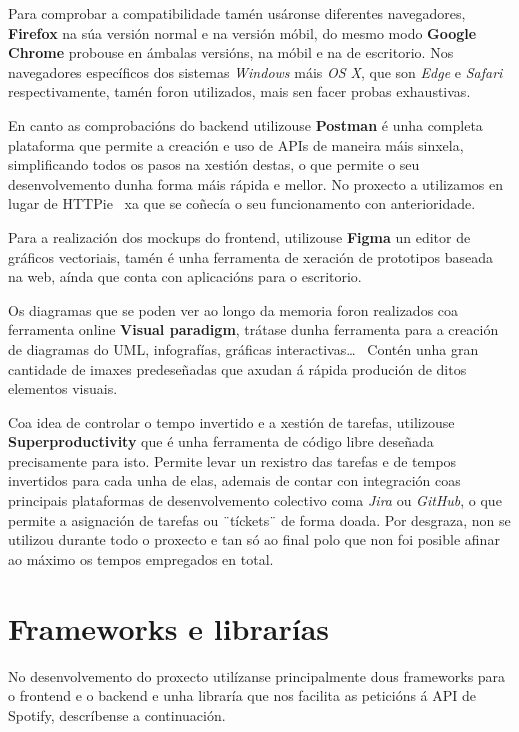 Para comprobar a compatibilidade tamén usáronse diferentes navegadores, \textbf{Firefox} na súa versión normal e na versión móbil, do mesmo modo \textbf{Google Chrome} probouse en ámbalas versións, na móbil e na de escritorio. Nos navegadores específicos dos sistemas \textit{Windows} máis \textit{OS X}, que son \textit{Edge} e \textit{Safari} respectivamente, tamén foron utilizados, mais sen facer probas exhaustivas.\medbreak

En canto as comprobacións do backend utilizouse \textbf{Postman}\label{sec:postman} é unha completa plataforma que permite a creación e uso de \glspl{API} de maneira máis sinxela, simplificando todos os pasos na xestión destas, o que permite o seu desenvolvemento dunha forma máis rápida e mellor. No proxecto a utilizamos en lugar de HTTPie~\cite{httpie} xa que se coñecía o seu funcionamento con anterioridade.\medbreak

Para a realización dos mockups do frontend, utilizouse \textbf{Figma} un editor de gráficos vectoriais, tamén é unha ferramenta de xeración de prototipos baseada na web, aínda que conta con aplicacións para o escritorio.\medbreak

Os diagramas que se poden ver ao longo da memoria foron realizados coa ferramenta online \textbf{Visual paradigm}, trátase dunha ferramenta para a creación de diagramas do \acrfull{UML}, infografías, gráficas interactivas\dots~ Contén unha gran cantidade de imaxes predeseñadas que axudan á rápida produción de ditos elementos visuais.\medbreak

Coa idea de controlar o tempo invertido e a xestión de tarefas, utilizouse \textbf{Superproductivity} que é unha ferramenta de código libre deseñada precisamente para isto. Permite levar un rexistro das tarefas e de tempos invertidos para cada unha de elas, ademais de contar con integración coas principais plataformas de desenvolvemento colectivo coma \textit{Jira} ou \textit{GitHub}, o que permite a asignación de tarefas ou ¨tíckets¨ de forma doada. Por desgraza, non se utilizou durante todo o proxecto e tan só ao final polo que non foi posible afinar ao máximo os tempos empregados en total.

\section{Frameworks e librarías}
No desenvolvemento do proxecto utilízanse principalmente dous \glspl{framework} para o \gls{frontend} e o \gls{backend} e unha libraría que nos facilita as peticións á \gls{API} de \gls{Spotify}, descríbense a continuación.

